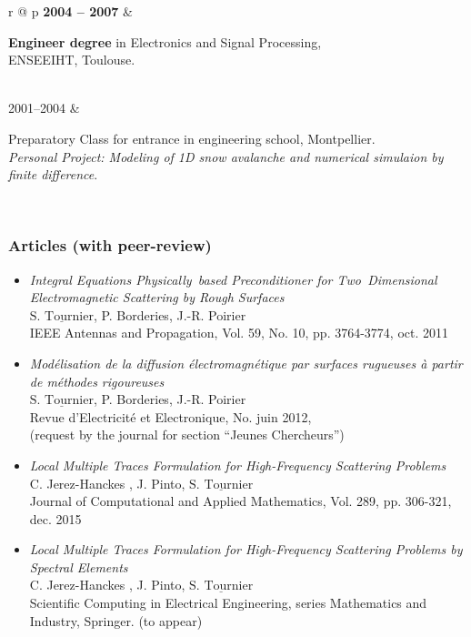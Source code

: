 \documentclass[a4paper,10pt,twoside]{article}
\newcommand{\categorie}[1]{\vspace*{0.1cm}\noindent%
	{\center  \colorbox[gray]{0.9}{\makebox[\textwidth][c]{\Large
              \sc {#1}}}\par}\vspace*{.5cm}}
\newlength{\texte}
\newlength{\textelarge}
\newcommand\moi{$\underline{\textrm{S. Tournier}}$}
\begin{document}
\begin{tabular}{r @{\qquad} p{\textelarge}}
  \textbf{2004 -- 2007} &
  \begin{minipage}[t]{\linewidth}
    \textbf{Engineer degree} in Electronics and Signal Processing,\\
    ENSEEIHT, Toulouse. \\
  \end{minipage} \\

  2001--2004 &
  \begin{minipage}[t]{\linewidth}
    Preparatory Class for entrance in engineering school, Montpellier. \\
    \small{\emph{Personal Project: Modeling of 1D snow avalanche and
        numerical simulaion by finite difference}}.
  \end{minipage} \\

\end{tabular}


\medskip

\categorie{Publications}
\subsubsection*{Articles (with peer-review)}

\begin{itemize}
\item[\textbullet]
\emph{Integral Equations Physically~based Preconditioner for Two~Dimensional Electromagnetic Scattering by Rough Surfaces} \\
 \moi , P. Borderies, J.-R. Poirier \\
\textsf{IEEE Antennas and Propagation},
Vol. 59, No. 10, pp. 3764-3774, oct. 2011 \\[-1ex]
\item[\textbullet]
\emph{Modélisation de la diffusion électromagnétique par surfaces
  rugueuses à partir de méthodes rigoureuses}\\
\moi , P. Borderies, J.-R. Poirier \\
\textsf{R}evue d'\textsf{E}lectricité et \textsf{E}lectronique,
No. juin 2012,\\
(request by the journal for section ``Jeunes Chercheurs'')
\item[\textbullet]
\emph{Local Multiple Traces Formulation for High-Frequency Scattering Problems} \\
 C. Jerez-Hanckes , J. Pinto, \moi \\
 \textsf{Journal of Computational and Applied Mathematics},
 Vol. 289, pp. 306-321, dec. 2015 %
\item[\textbullet]
 \emph{Local Multiple Traces Formulation for High-Frequency Scattering
   Problems by Spectral Elements}\\
 C. Jerez-Hanckes , J. Pinto, \moi \\
\textsf{Scientific Computing in Electrical Engineering}, series
Mathematics and Industry, Springer. (to appear)
\end{itemize}
\end{document}
